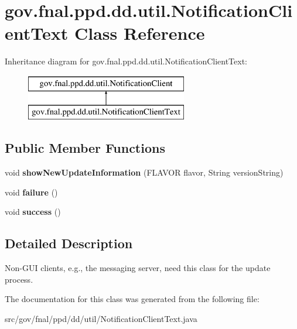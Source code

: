 \hypertarget{classgov_1_1fnal_1_1ppd_1_1dd_1_1util_1_1NotificationClientText}{\section{gov.\-fnal.\-ppd.\-dd.\-util.\-Notification\-Client\-Text Class Reference}
\label{classgov_1_1fnal_1_1ppd_1_1dd_1_1util_1_1NotificationClientText}
}
Inheritance diagram for gov.\-fnal.\-ppd.\-dd.\-util.\-Notification\-Client\-Text\-:\begin{figure}[H]
\begin{center}
\leavevmode
\includegraphics[height=2.000000cm]{classgov_1_1fnal_1_1ppd_1_1dd_1_1util_1_1NotificationClientText}
\end{center}
\end{figure}
\subsection*{Public Member Functions}
\begin{DoxyCompactItemize}
\item 
\hypertarget{classgov_1_1fnal_1_1ppd_1_1dd_1_1util_1_1NotificationClientText_a101830e2bc0bd606f0c1d51e2426cafd}{void {\bfseries show\-New\-Update\-Information} (F\-L\-A\-V\-O\-R flavor, String version\-String)}\label{classgov_1_1fnal_1_1ppd_1_1dd_1_1util_1_1NotificationClientText_a101830e2bc0bd606f0c1d51e2426cafd}

\item 
\hypertarget{classgov_1_1fnal_1_1ppd_1_1dd_1_1util_1_1NotificationClientText_ac45efc4a5d0d7f50d21cbae42f9e08cb}{void {\bfseries failure} ()}\label{classgov_1_1fnal_1_1ppd_1_1dd_1_1util_1_1NotificationClientText_ac45efc4a5d0d7f50d21cbae42f9e08cb}

\item 
\hypertarget{classgov_1_1fnal_1_1ppd_1_1dd_1_1util_1_1NotificationClientText_a5deeec962527801cc0eed2c78f303d9d}{void {\bfseries success} ()}\label{classgov_1_1fnal_1_1ppd_1_1dd_1_1util_1_1NotificationClientText_a5deeec962527801cc0eed2c78f303d9d}

\end{DoxyCompactItemize}


\subsection{Detailed Description}
Non-\/\-G\-U\-I clients, e.\-g., the messaging server, need this class for the update process. 

The documentation for this class was generated from the following file\-:\begin{DoxyCompactItemize}
\item 
src/gov/fnal/ppd/dd/util/Notification\-Client\-Text.\-java\end{DoxyCompactItemize}
